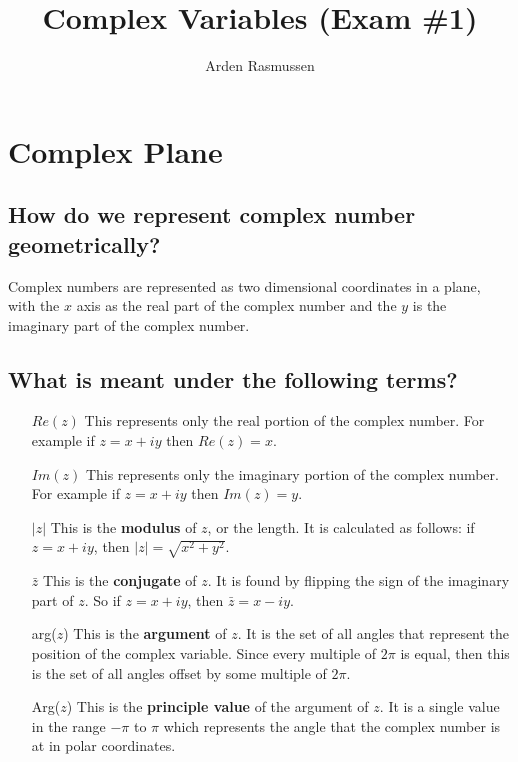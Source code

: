 \documentclass[12pt]{article}
\title{Complex Variables (Exam \#1)}
\author{Arden Rasmussen}
\begin{document}
\maketitle
\newpage
\tableofcontents
\newpage
{}

\section{Complex Plane}%
\label{sec:complex_plane}

\subsection{How do we represent complex number geometrically?}%
\label{sub:how_do_we_represent_complex_number_geometrically_}

Complex numbers are represented as two dimensional coordinates in a plane, with
the $x$ axis as the real part of the complex number and the $y$ is the
imaginary part of the complex number.

\subsection{What is meant under the following terms?}%
\label{sub:what_is_meant_under_the_following_terms_}

\begin{itemize}
  \item[$Re(z)$] This represents only the real portion of the complex number.
    For example if $z = x + iy$ then $Re(z) = x$.
  \item[$Im(z)$] This represents only the imaginary portion of the complex
    number.  For example if $z = x + iy$ then $Im(z) = y$.
  \item[$|z|$] This is the \textbf{modulus} of $z$, or the length. It is
    calculated as follows: if $z = x+iy$, then $|z| = \sqrt{x^2+y^2}$.
  \item[$\bar{z}$] This is the \textbf{conjugate} of $z$. It is found by
    flipping the sign of the imaginary part of $z$. So if $z=x+iy$, then
    $\bar{z} = x - iy$.
  \item[arg($z$)] This is the \textbf{argument} of $z$. It is the set of all
    angles that represent the position of the complex variable. Since every
    multiple of $2\pi$ is equal, then this is the set of all angles offset by
    some multiple of $2\pi$.
  \item[Arg($z$)] This is the \textbf{principle value} of the argument of $z$.
    It is a single value in the range $-\pi$ to $\pi$ which represents the
    angle that the complex number is at in polar coordinates.
\end{itemize}
\end{document}
